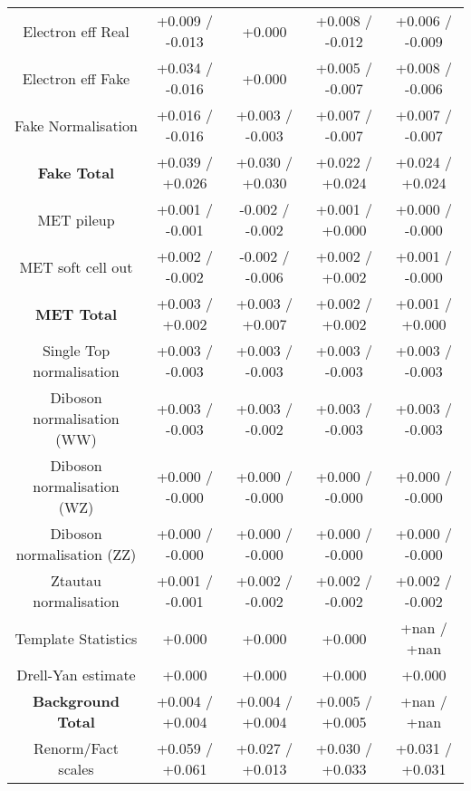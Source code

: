 \begin{table}[htbp]
\begin{center}
\begin{tabular}{|c|c|c|c|c|}
Electron eff Real                     &+0.009   / -0.013   & +0.000              & +0.008   / -0.012   & +0.006   / -0.009  \\
Electron eff Fake                     &+0.034   / -0.016   & +0.000              & +0.005   / -0.007   & +0.008   / -0.006  \\
Fake Normalisation                    &+0.016   / -0.016   & +0.003   / -0.003   & +0.007   / -0.007   & +0.007   / -0.007  \\
\hline
\textbf{Fake Total}                   &+0.039   / +0.026   & +0.030   / +0.030   & +0.022   / +0.024   & +0.024   / +0.024  \\
\hline
MET pileup                            &+0.001   / -0.001   & -0.002   / -0.002   & +0.001   / +0.000   & +0.000   / -0.000  \\
MET soft cell out                     &+0.002   / -0.002   & -0.002   / -0.006   & +0.002   / +0.002   & +0.001   / -0.000  \\
\hline
\textbf{MET Total}                    &+0.003   / +0.002   & +0.003   / +0.007   & +0.002   / +0.002   & +0.001   / +0.000  \\
\hline
Single Top normalisation              &+0.003   / -0.003   & +0.003   / -0.003   & +0.003   / -0.003   & +0.003   / -0.003  \\
Diboson normalisation (WW)            &+0.003   / -0.003   & +0.003   / -0.002   & +0.003   / -0.003   & +0.003   / -0.003  \\
Diboson normalisation (WZ)            &+0.000   / -0.000   & +0.000   / -0.000   & +0.000   / -0.000   & +0.000   / -0.000  \\
Diboson normalisation (ZZ)            &+0.000   / -0.000   & +0.000   / -0.000   & +0.000   / -0.000   & +0.000   / -0.000  \\
Ztautau normalisation                 &+0.001   / -0.001   & +0.002   / -0.002   & +0.002   / -0.002   & +0.002   / -0.002  \\
Template Statistics                   &+0.000              & +0.000              & +0.000              & +nan     / +nan    \\
Drell-Yan estimate                    &+0.000              & +0.000              & +0.000              & +0.000             \\
\hline
\textbf{Background Total}             &+0.004   / +0.004   & +0.004   / +0.004   & +0.005   / +0.005   & +nan     / +nan    \\
\hline
Renorm/Fact scales                    &+0.059   / +0.061   & +0.027   / +0.013   & +0.030   / +0.033   & +0.031   / +0.031  \\

\end{tabular}
\end{center}
\end{table}
